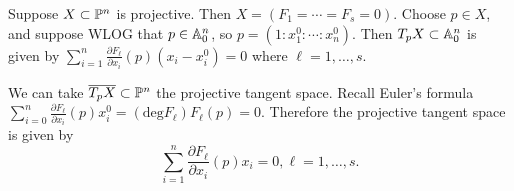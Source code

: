 \documentclass[twoside, 10pt]{article}
\begin{document}
    \begin{rmk} Suppose $X \subset \P^n$ is projective. Then $X = (F_1 = \cdots
        = F_s = 0)$. Choose $p \in X$, and suppose WLOG that $p \in \A^n_0$, so
        $p = (1:x_1^0:\cdots:x_n^0)$. Then $T_p X \subset \A_0^n$ is given by
        $\sum_{i=1}^n \frac{\partial F_{\ell}}{\partial x_i}(p)(x_i - x_i^0) =
        0$ where $\ell = 1, \ldots, s$.

        We can take $\overline{T_pX} \subset \P^n$ the projective tangent
        space. Recall Euler's formula $\sum_{i=0}^n \frac{\partial
        F_{\ell}}{\partial x_i}(p) x_i^0 = (\mathrm{deg}F_{\ell}) F_{\ell}(p) =
        0$. Therefore the projective tangent space is given by \[ \sum_{i=1}^n
        \frac{\partial F_{\ell}}{\partial x_i}(p) x_i = 0, \ell = 1, \ldots, s.
    \] \end{rmk}
    
\end{document}
